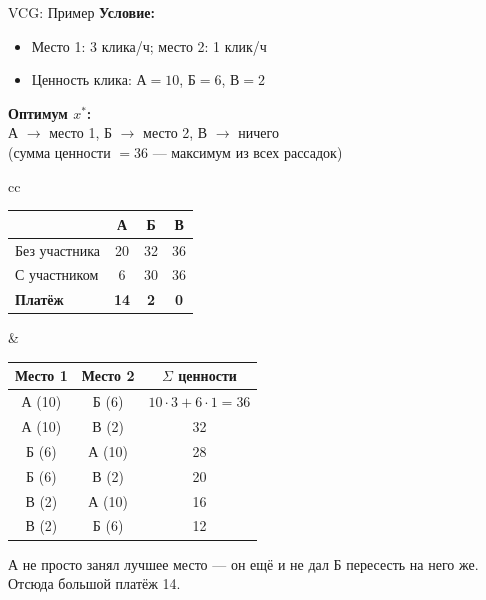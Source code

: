 \documentclass[10pt]{beamer}
\begin{document}
\begin{frame}{VCG: Пример}
  \textbf{Условие:}
    \begin{itemize}
      \item Место 1: 3 клика/ч; место 2: 1 клик/ч
      \item Ценность клика: А$=10$, Б$=6$, В$=2$
    \end{itemize}
  
  \vspace{0.2cm}
    \small{
    \textbf{Оптимум $x^*$:}\\
    А $\to$ место 1, Б $\to$ место 2, В $\to$ ничего\\
    (сумма ценности $=36$ — максимум из всех рассадок)}

  \vspace{0.4cm}
  \begin{tabular}{cc}

          \begin{tabular}{@{}lccc@{}}
            \toprule
            & \textbf{А} & \textbf{Б} & \textbf{В} \\
            \midrule
            Без участника & 20 & 32 & 36 \\
            С участником  & 6  & 30 & 36 \\
            \midrule
            \textbf{Платёж} & \textbf{14} & \textbf{2} & \textbf{0} \\
            \bottomrule
          \end{tabular}
          &
          {\footnotesize
          \begin{tabular}{ccc}
              \toprule
              Место 1 & Место 2 & $\Sigma$ ценности \\
              \midrule
              А (10) & Б (6) & $10\cdot3+6\cdot1=36$  \\
              А (10) & В (2) & 32 \\
              Б (6) & А (10) & 28 \\
              Б (6) & В (2) & 20 \\
              В (2) & А (10) & 16 \\
              В (2) & Б (6) & 12 \\
              \bottomrule
          \end{tabular}}
  \end{tabular}

  \vspace{0.3cm}
  \begin{alertblock}{}
    А не просто занял лучшее место — он ещё и не дал Б пересесть на него же. Отсюда большой платёж 14.
  \end{alertblock}
\end{frame}
\end{document}
